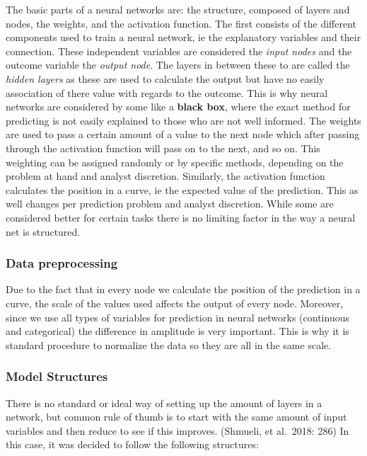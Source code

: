 \documentclass[
  paper=a4,
  ,captions=tableheading
]{scrartcl}
\begin{document}
The basic parts of a neural networks are: the structure, composed of
layers and nodes, the weights, and the activation function. The first
consists of the different components used to train a neural network, ie
the explanatory variables and their connection. These independent
variables are considered the \emph{input nodes} and the outcome variable
the \emph{output node}. The layers in between these to are called the
\emph{hidden layers} as these are used to calculate the output but have
no easily association of there value with regards to the outcome. This
is why neural networks are considered by some like a \textbf{black box},
where the exact method for predicting is not easily explained to those
who are not well informed. The weights are used to pass a certain amount
of a value to the next node which after passing through the activation
function will pass on to the next, and so on. This weighting can be
assigned randomly or by specific methods, depending on the problem at
hand and analyst discretion. Similarly, the activation function
calculates the position in a curve, ie the expected value of the
prediction. This as well changes per prediction problem and analyst
discretion. While some are considered better for certain tasks there is
no limiting factor in the way a neural net is structured.

\hypertarget{data-preprocessing}{%
\subsubsection{Data preprocessing}\label{data-preprocessing}}

Due to the fact that in every node we calculate the position of the
prediction in a curve, the scale of the values used affects the output
of every node. Moreover, since we use all types of variables for
prediction in neural networks (continuous and categorical) the
difference in amplitude is very important. This is why it is standard
procedure to normalize the data so they are all in the same scale.

\hypertarget{model-structures}{%
\subsubsection{Model Structures}\label{model-structures}}

There is no standard or ideal way of setting up the amount of layers in
a network, but common rule of thumb is to start with the same amount of
input variables and then reduce to see if this improves. (Shmueli, et
al.~2018: 286) In this case, it was decided to follow the following
structures:
\end{document}
